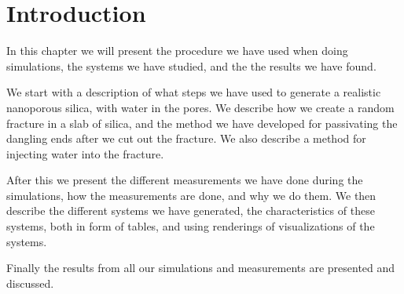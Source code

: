 \chapter*{Introduction}%
%
In this chapter we will present the procedure we have used when doing simulations, the systems we have studied, and the the results we have found. 

We start with a description of what steps we have used to generate a realistic nanoporous silica, with water in the pores. We describe how we create a random fracture in a slab of silica, and the method we have developed for passivating the dangling ends after we cut out the fracture. We also describe a method for injecting water into the fracture.

After this we present the different measurements we have done during the simulations, how the measurements are done, and why we do them. We then describe the different systems we have generated, the characteristics of these systems, both in form of tables, and using renderings of visualizations of the systems.

Finally the results from all our simulations and measurements are presented and discussed. 